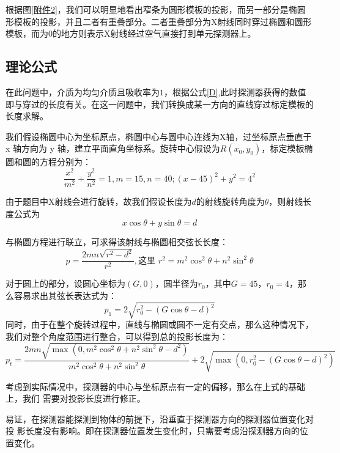 \documentclass[12pt]{ctexart}
\begin{document}
	根据图\ref{附件2}，我们可以明显地看出窄条为圆形模板的投影，而另一部分是椭圆形模板的投影，并且二者有重叠部分。二者重叠部分为X射线同时穿过椭圆和圆形模板，而为0的地方则表示X射线经过空气直接打到单元探测器上。
	
	\subsection{理论公式}
	
	在此问题中，介质为均匀介质且吸收率为$1$，根据公式\ref{D},此时探测器获得的数值即与穿过的长度有关。在这一问题中，我们转换成某一方向的直线穿过标定模板的长度求解。
	
	我们假设椭圆中心为坐标原点，椭圆中心与圆中心连线为X轴，过坐标原点垂直于 x 轴方向为 y 轴，建立平面直角坐标系。旋转中心假设为$R(x_0,y_0)$，标定模板椭圆和圆的方程分别为：
	\begin{equation*}
		\frac{x^2}{m^2} + \frac{y^2}{n^2} = 1,m=15,n=40 ; (x - 45)^2 + y^2 = 4^2
	\end{equation*}
	
	由于题目中X射线会进行旋转，故我们假设长度为$d$的射线旋转角度为$\theta$，则射线长度公式为
	\begin{equation*}
		x\cos\theta + y\sin\theta = d
	\end{equation*}
	
	与椭圆方程进行联立，可求得该射线与椭圆相交弦长长度：
	\begin{equation*}
		p = \frac{2mn \sqrt{r^2 - d^2}}{r^2},\text{这里 } r^2 = m^2 \cos^2 \theta + n^2 \sin^2 \theta
	\end{equation*}
	
	对于圆上的部分，设圆心坐标为$(G, 0)$，圆半径为$r_0$，其中$G = 45，r_0 = 4$，那么容易求出其弦长表达式为：
	\begin{equation*}
		p_1 = 2 \sqrt{r_0^2 - (G \cos \theta - d)^2}
	\end{equation*}
	同时，由于在整个旋转过程中，直线与椭圆或圆不一定有交点，那么这种情况下，我们对整个角度范围进行整合，可以得到总的投影长度为：
	\begin{equation*}
		p_t = \frac{2mn \sqrt{\max(0, m^2 \cos^2 \theta + n^2 \sin^2 \theta - d^2)}}{m^2 \cos^2 \theta + n^2 \sin^2 \theta}
		+ 2 \sqrt{\max(0, r_0^2 - (G \cos \theta - d)^2)}
	\end{equation*}
	
	考虑到实际情况中，探测器的中心与坐标原点有一定的偏移，那么在上式的基础上，我们
	需要对投影长度进行修正。
	
	易证，在探测器能探测到物体的前提下，沿垂直于探测器方向的探测器位置变化对投
	影长度没有影响。即在探测器位置发生变化时，只需要考虑沿探测器方向的位置变化。
	
\end{document}
